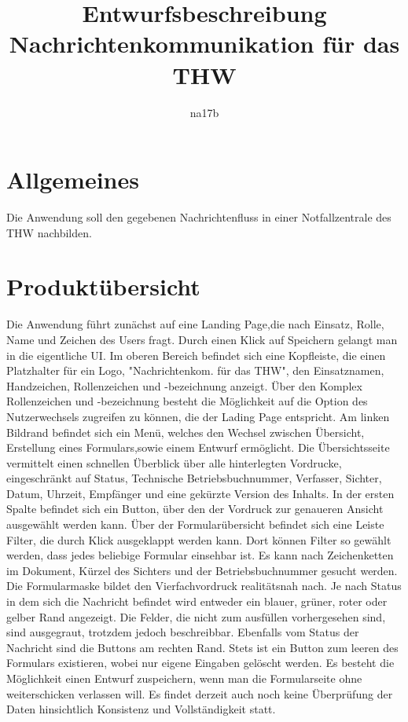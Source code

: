 \documentclass[a4paper,11pt,oneside, titlepage]{article}
\title{Entwurfsbeschreibung\\Nachrichtenkommunikation für das THW}
\author{na17b}
\date{}
\begin{document}
\maketitle


\tableofcontents


\newpage


\section{Allgemeines}
Die Anwendung soll den gegebenen Nachrichtenfluss in einer Notfallzentrale des THW nachbilden.
\section{Produktübersicht}
Die Anwendung führt zunächst auf eine Landing Page,die nach Einsatz, Rolle, Name und Zeichen des Users fragt. Durch einen Klick auf Speichern gelangt man in die eigentliche UI. Im oberen Bereich befindet sich eine Kopfleiste, die einen Platzhalter für ein Logo, "Nachrichtenkom. für das THW", den Einsatznamen, Handzeichen, Rollenzeichen und -bezeichnung anzeigt. Über den Komplex Rollenzeichen und -bezeichnung besteht die Möglichkeit auf die Option des Nutzerwechsels zugreifen zu können, die der Lading Page entspricht. Am linken Bildrand befindet sich ein Menü, welches den Wechsel zwischen Übersicht, Erstellung eines Formulars,sowie einem Entwurf ermöglicht. Die Übersichtsseite vermittelt einen schnellen Überblick über alle hinterlegten Vordrucke, eingeschränkt auf Status, Technische Betriebsbuchnummer, Verfasser, Sichter, Datum, Uhrzeit, Empfänger und eine gekürzte Version des Inhalts. In der ersten Spalte befindet sich ein Button, über den der Vordruck zur genaueren Ansicht ausgewählt werden kann. Über der Formularübersicht befindet sich eine Leiste Filter, die durch Klick ausgeklappt werden kann. Dort können Filter so gewählt werden, dass jedes beliebige Formular einsehbar ist. Es kann nach Zeichenketten im Dokument, Kürzel des Sichters und der Betriebsbuchnummer gesucht werden. Die Formularmaske bildet den Vierfachvordruck realitätsnah nach. Je nach Status in dem sich die Nachricht befindet wird entweder ein blauer, grüner, roter oder gelber Rand angezeigt. Die Felder, die nicht zum ausfüllen vorhergesehen sind, sind ausgegraut, trotzdem jedoch beschreibbar. Ebenfalls vom Status der Nachricht sind die Buttons am rechten Rand. Stets ist ein Button zum leeren des Formulars existieren, wobei nur eigene Eingaben gelöscht werden. Es besteht die Möglichkeit einen Entwurf zuspeichern, wenn man die Formularseite ohne weiterschicken verlassen will. Es findet derzeit auch noch keine Überprüfung der Daten hinsichtlich Konsistenz und Vollständigkeit statt. 
\end{document}
